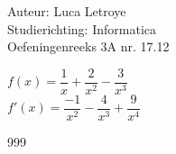 \documentclass[a4paper]{article}
\begin{document}
  
\noindent \large Auteur: Luca Letroye        \\
\noindent \large Studierichting: Informatica \\
\noindent \large Oefeningenreeks 3A nr. 17.12 \\

\medskip

\normalsize

$f(x) =  \dfrac{1}{x} + \dfrac{2}{x^2} - \dfrac{3}{x^3}$\\

$f'(x) = \dfrac{-1}{x^2} - \dfrac{4}{x^3} + \dfrac{9}{x^4}$\\


\begin{thebibliography}{999}
\end{thebibliography}
\end{document}
